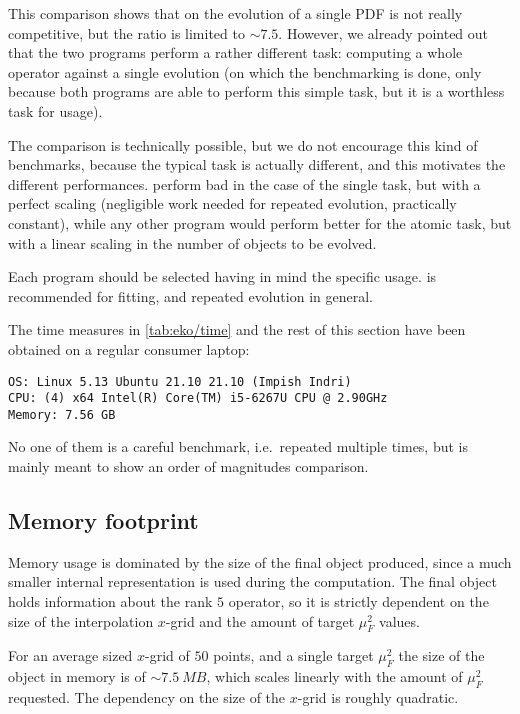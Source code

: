 This comparison shows that on the evolution of a single PDF \eko{} is not
really competitive, but the ratio is limited to $\sim 7.5$. 
However, we already pointed out that the two programs perform a rather
different task: computing a whole operator against a single \pdf{} evolution
(on which the benchmarking is done, only because both programs are able to
perform this simple task, but it is a worthless task for \eko{} usage).

The comparison is technically possible, but we do not encourage this kind of
benchmarks, because the typical task is actually different, and this motivates
the different performances.
\eko{} perform bad in the case of the single task, but with a perfect scaling
(negligible work needed for repeated evolution, practically constant), while
any other program would perform better for the atomic task, but with a linear
scaling in the number of objects to be evolved.

Each program should be selected having in mind the specific usage. \eko{} is
recommended for \pdf{} fitting, and repeated evolution in general.

The time measures in \cref{tab:eko/time} and the rest of this
section have been obtained on a regular consumer laptop:
\begin{verbatim}
OS: Linux 5.13 Ubuntu 21.10 21.10 (Impish Indri)
CPU: (4) x64 Intel(R) Core(TM) i5-6267U CPU @ 2.90GHz
Memory: 7.56 GB
\end{verbatim}
No one of them is a careful benchmark, i.e.\ repeated multiple times, but is
mainly meant to show an order of magnitudes comparison.

\subsection{Memory footprint}
\label{sec:eko/memory}

Memory usage is dominated by the size of the final object produced,
since a much smaller internal representation is used during the computation.
The final object holds information about the rank $5$ operator, so it is
strictly dependent on the size of the interpolation $x$-grid and the amount of
target $\mu_F^2$ values.

For an average sized $x$-grid of $50$ points, and a single target $\mu_F^2$ the
size of the object in memory is of $\sim \SI{7.5}{MB}$, which scales linearly
with the amount of $\mu_F^2$ requested.
The dependency on the size of the $x$-grid is roughly quadratic.

